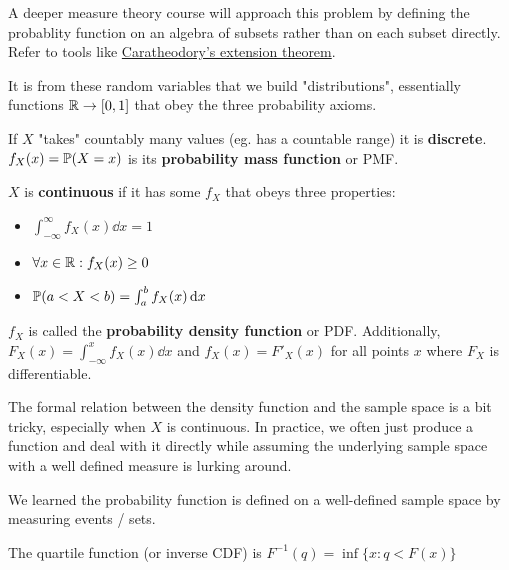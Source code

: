 \documentclass[10pt]{article}
\begin{document}
\begin{note}
    A deeper measure theory course will approach this problem by defining the
    probablity function on an algebra of subsets rather than on each subset
    directly. Refer to tools like \href{https://en.wikipedia.org/wiki/Carath%C3%A9odory%27s_extension_theorem}{Caratheodory's extension theorem}.
\end{note}

It is from these random variables that we build "distributions", essentially
functions $\R \to [0, 1]$ that obey the three probability axioms.

\begin{definition}
    If $X$ "takes" countably many values (eg. has a countable range) it is
    \textbf{discrete}. $f_X(x) = \P(X = x)$ is its \textbf{probability mass
    function} or PMF.
\end{definition}

\begin{definition}
    $X$ is \textbf{continuous} if it has some $f_X$ that obeys three properties:
    \begin{itemize}
        \item{$\int_{-\infty}^{\infty} f_X(x) \dd x = 1$}
        \item{$ \forall x \in \R: f_X(x) \geq 0$}
        \item{$\P(a < X < b) = \int_a^b f_X(x) \dd x$}
    \end{itemize}
    $f_X$ is called the \textbf{probability density function} or PDF.
    Additionally, $F_X(x) = \int_{-\infty}^x f_X(x) \dd x$ and $f_X(x) =
    F'_X(x)$ for all points $x$ where $F_X$ is differentiable.
\end{definition}

The formal relation between the density function and the sample space is a bit
tricky, especially when $X$ is continuous. In practice, we often just produce
a function and deal with it directly while assuming the underlying sample space
with a well defined measure is lurking around.

\begin{note}
    We learned the probability function is defined on a well-defined sample space by measuring events / sets. 
\end{note}

\begin{definition}
    The quartile function (or inverse CDF) is $F^{-1}(q) = \inf\{ x : q < F(x) \}$
\end{definition}
\end{document}
